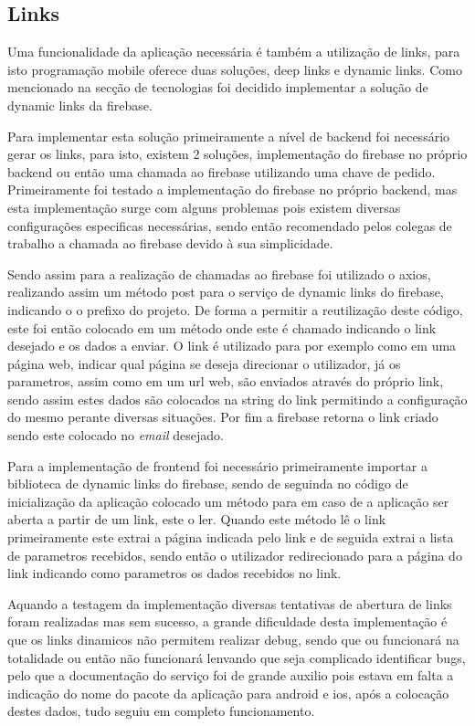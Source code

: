 \subsection{Links}
Uma funcionalidade da aplicação necessária é também a utilização de links, para isto programação mobile oferece duas soluções, deep links e dynamic links. Como mencionado na secção de tecnologias foi decidido implementar a solução de dynamic links da firebase.

Para implementar esta solução primeiramente a nível de backend foi necessário gerar os links, para isto, existem 2 soluções, implementação do firebase no próprio backend ou então uma chamada ao firebase utilizando uma chave de pedido. Primeiramente foi testado a implementação do firebase no próprio backend, mas esta implementação surge com alguns problemas pois existem diversas configurações especificas necessárias, sendo então recomendado pelos colegas de trabalho a chamada ao firebase devido à sua simplicidade.

Sendo assim para a realização de chamadas ao firebase foi utilizado o axios, realizando assim um método post para o serviço de dynamic links do firebase, indicando o o prefixo do projeto. De forma a permitir a reutilização deste código, este foi então colocado em um método onde este é chamado indicando o link desejado e os dados a enviar. O link é utilizado para por exemplo como em uma página web, indicar qual página se deseja direcionar o utilizador, já os parametros, assim como em um url web, são enviados através do próprio link, sendo assim estes dados são colocados na string do link permitindo a configuração do mesmo perante diversas situações. Por fim a firebase retorna o link criado sendo este colocado no \textit{email} desejado.

Para a implementação de frontend foi necessário primeiramente importar a biblioteca de dynamic links do firebase, sendo de seguinda no código de inicialização da aplicação colocado um método para em caso de a aplicação ser aberta a partir de um link, este o ler. Quando este método lê o link primeiramente este extrai a página indicada pelo link e de seguida extrai a lista de parametros recebidos, sendo então o utilizador redirecionado para a página do link indicando como parametros os dados recebidos no link.

Aquando a testagem da implementação diversas tentativas de abertura de links foram realizadas mas sem sucesso, a grande dificuldade desta implementação é que os links dinamicos não permitem realizar debug, sendo que ou funcionará na totalidade ou então não funcionará lenvando que seja complicado identificar bugs, pelo que a documentação do serviço foi de grande auxilio pois estava em falta a indicação do nome do pacote da aplicação para android e ios, após a colocação destes dados, tudo seguiu em completo funcionamento.